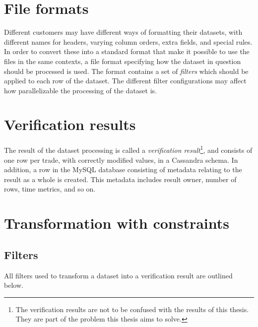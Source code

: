 \section{File formats}
Different customers may have different ways of formatting their datasets, with different names for headers, varying column orders, extra fields,
and special rules. In order to convert these into a standard format that make it possible to use the files in the same contexts, a file format specifying
how the dataset in question should be processed is used. The format contains a set of \textit{filters} which should be applied to each row of the dataset.
The different filter configurations may affect how parallelizable the processing of the dataset is.

\section{Verification results}
The result of the dataset processing is called a \textit{verification result}\footnote{The verification results are not to be confused with the results of this thesis. They are part of the problem this thesis aims to solve.}, and consists of one row per trade, with correctly modified values, in a Cassandra schema.
In addition, a row in the MySQL database consisting of metadata relating to the result as a whole is created. This metadata includes result owner, number of rows, time metrics, and so on.

\section{Transformation with constraints}
\subsection{Filters}
All filters used to transform a dataset into a verification result are outlined below.

